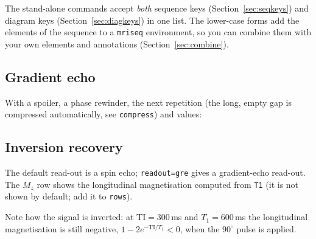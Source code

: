 \documentclass[11pt]{article}
\newcommand\key[1]{\texttt{#1}}
\begin{document}
The stand-alone commands accept \emph{both} sequence keys
(Section~\ref{sec:seqkeys}) and diagram keys (Section~\ref{sec:diagkeys}) in
one list. The lower-case forms add the elements of the sequence to a
\texttt{mriseq} environment, so you can combine them with your own elements and
annotations (Section~\ref{sec:combine}).

\subsection{Gradient echo}
\begin{example}
\GradientEchoDiagram[flip label=$\alpha$]
\end{example}

With a spoiler, a phase rewinder, the next repetition (the long, empty gap
is compressed automatically, see \key{compress}) and values:
\begin{example}
\GradientEchoDiagram[spoiler, rewinder, show TR, TR=30, values,
                     phase highlight=0.5]
\end{example}

\subsection{Inversion recovery}
The default read-out is a spin echo; \key{readout=gre} gives a gradient-echo
read-out. The $M_z$ row shows the longitudinal magnetisation computed from
\key{T1} (it is not shown by default; add it to \key{rows}).
\begin{example}
\InversionRecoveryDiagram[rows={rf,gz,gy,gx,sig,mz}, TI=300, T1=600]
\end{example}

Note how the signal is inverted: at $\mathrm{TI}=300$\,ms and
$T_1=600$\,ms the longitudinal magnetisation is still negative,
$1-2e^{-\mathrm{TI}/T_1}<0$, when the $90^\circ$ pulse is applied.
\end{document}
